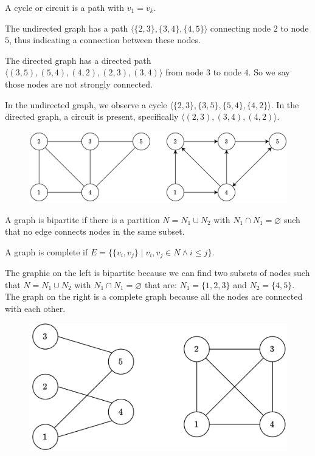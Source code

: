 \begin{definition}      
    A cycle or circuit is a path with $v_1=v_k$.
\end{definition}
\begin{example}
    The undirected graph has a path $\langle \{2,3\},\{3,4\},\{4,5\}\rangle$ connecting node $2$ to node $5$, thus indicating a connection between these nodes.
    
    The directed graph has a directed path $\langle (3,5),(5,4),(4,2),(2,3),(3,4) \rangle$ from node $3$ to node $4$. So we say those nodes are not strongly connected. 
    
    In the undirected graph, we observe a cycle $\langle \{2,3\},\{3,5\},\{5,4\},\{4,2\}\rangle$. 
    In the directed graph, a circuit is present, specifically $\langle (2,3),(3,4),(4,2) \rangle$. 
    \begin{figure}[H]
        \centering
        \includegraphics[width=0.6\linewidth]{images/graph.png}
    \end{figure}
\end{example}
\newpage
\begin{definition}
    A graph is bipartite if there is a partition $N=N_1 \cup N_2$ with $N_1 \cap N_1 = \varnothing$ such that no edge connects nodes in the same subset. 
\end{definition}
\begin{definition}
    A graph is complete if $E=\{ \{v_i,v_j\} \mid  v_i,v_j \in N \land i \leq j \}$.
\end{definition}
\begin{example}
    The graphic on the left is bipartite because we can find two subsets of nodes such that $N=N_1 \cup N_2$ with $N_1 \cap N_1 = \varnothing$ that are: $N_1=\{1,2,3\}$ and $N_2=\{4,5\}$. 
    The graph on the right is a complete graph because all the nodes are connected with each other. 
    \begin{figure}[H]
        \centering
        \includegraphics[width=0.5\linewidth]{images/bipcomp.png}
    \end{figure}
\end{example}
